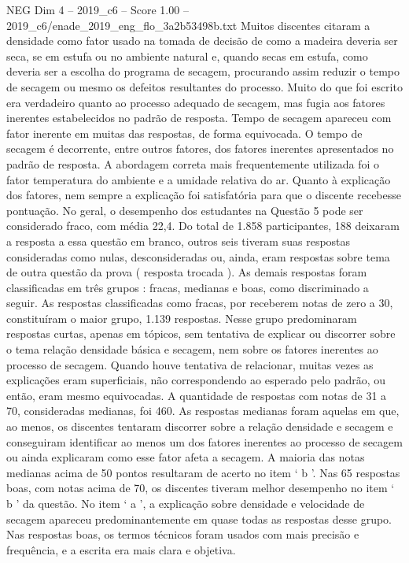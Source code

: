 \begin{textsample}{NEG Dim 4 – 2019\_c6 – Score 1.00 – 2019\_c6/enade\_2019\_eng\_flo\_3a2b53498b.txt}
Muitos discentes citaram a densidade como fator usado na tomada de decisão de como a madeira deveria ser seca, se em estufa ou no ambiente natural e, quando secas em estufa, como deveria ser a escolha do programa de secagem, procurando assim reduzir o tempo de secagem ou mesmo os defeitos resultantes do processo.
Muito do que foi escrito era verdadeiro quanto ao processo adequado de secagem, mas fugia aos fatores inerentes estabelecidos no padrão de resposta.
Tempo de secagem apareceu com fator inerente em muitas das respostas, de forma equivocada.
O tempo de secagem é decorrente, entre outros fatores, dos fatores inerentes apresentados no padrão de resposta.
A abordagem correta mais frequentemente utilizada foi o fator temperatura do ambiente e a umidade relativa do ar.
Quanto à explicação dos fatores, nem sempre a explicação foi satisfatória para que o discente recebesse pontuação.
No geral, o desempenho dos estudantes na Questão 5 pode ser considerado fraco, com média 22,4.
Do total de 1.858 participantes, 188 deixaram a resposta a essa questão em branco, outros seis tiveram suas respostas consideradas como nulas, desconsideradas ou, ainda, eram respostas sobre tema de outra questão da prova ( resposta trocada ).
As demais respostas foram classificadas em três grupos : fracas, medianas e boas, como discriminado a seguir.
As respostas classificadas como fracas, por receberem notas de zero a 30, constituíram o maior grupo, 1.139 respostas.
Nesse grupo predominaram respostas curtas, apenas em tópicos, sem tentativa de explicar ou discorrer sobre o tema relação densidade básica e secagem, nem sobre os fatores inerentes ao processo de secagem.
Quando houve tentativa de relacionar, muitas vezes as explicações eram superficiais, não correspondendo ao esperado pelo padrão, ou então, eram mesmo equivocadas.
A quantidade de respostas com notas de 31 a 70, consideradas medianas, foi 460.
As respostas medianas foram aquelas em que, ao menos, os discentes tentaram discorrer sobre a relação densidade e secagem e conseguiram identificar ao menos um dos fatores inerentes ao processo de secagem ou ainda explicaram como esse fator afeta a secagem.
A maioria das notas medianas acima de 50 pontos resultaram de acerto no item ‘ b ’.
Nas 65 respostas boas, com notas acima de 70, os discentes tiveram melhor desempenho no item ‘ b ’ da questão.
No item ‘ a ’, a explicação sobre densidade e velocidade de secagem apareceu predominantemente em quase todas as respostas desse grupo.
Nas respostas boas, os termos técnicos foram usados com mais precisão e frequência, e a escrita era mais clara e objetiva.

\end{textsample}
